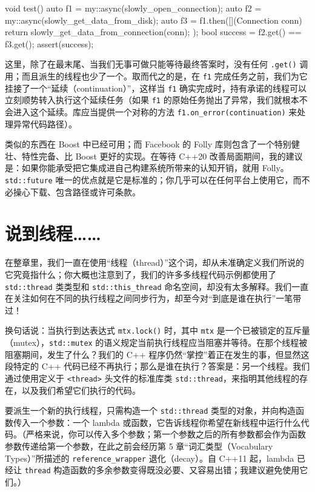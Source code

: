 \begin{codebox}[cpp]
    void test() {
      auto f1 = my::async(slowly_open_connection);
      auto f2 = my::async(slowly_get_data_from_disk);
      auto f3 = f1.then([](Connection conn) {
        return slowly_get_data_from_connection(conn);
      });
      bool success = f2.get() == f3.get();
      assert(success);
    }
\end{codebox}

这里，除了在最末尾、当我们无事可做只能等待最终答案时，没有任何 \texttt{.get(\allowbreak{})\allowbreak{}} 调用；而且派生的线程也少了一个。取而代之的是，在 \texttt{f1} 完成任务之前，我们为它挂接了一个“延续（continuation）”，这样当 \texttt{f1} 确实完成时，持有承诺的线程可以立刻顺势转入执行这个延续任务（如果 \texttt{f1} 的原始任务抛出了异常，我们就根本不会进入这个延续。库应当提供一个对称的方法 \texttt{f1.on\_\allowbreak{}error(\allowbreak{}continuation)\allowbreak{}} 来处理异常代码路径）。

类似的东西在 Boost 中已经可用；而 Facebook 的 Folly 库则包含了一个特别健壮、特性完备、比 Boost 更好的实现。在等待 C++20 改善局面期间，我的建议是：如果你能承受把它集成进自己构建系统所带来的认知开销，就用 Folly。\texttt{std::\allowbreak{}future} 唯一的优点就是它是标准的；你几乎可以在任何平台上使用它，而不必操心下载、包含路径或许可条款。

\section{说到线程……}

在整章里，我们一直在使用“线程（thread）”这个词，却从未准确定义我们所说的它究竟指什么；你大概也注意到了，我们的许多多线程代码示例都使用了 \texttt{std::\allowbreak{}thread} 类类型和 \texttt{std::\allowbreak{}this\_\allowbreak{}thread} 命名空间，却没有太多解释。我们一直在关注如何在不同的执行线程之间同步行为，却至今对“到底是谁在执行”一笔带过！

换句话说：当执行到达表达式 \texttt{mtx.\allowbreak{}lock(\allowbreak{})\allowbreak{}} 时，其中 \texttt{mtx} 是一个已被锁定的互斥量（mutex），\texttt{std::\allowbreak{}mutex} 的语义规定当前执行线程应当阻塞并等待。在那个线程被阻塞期间，发生了什么？我们的 C++ 程序仍然“掌控”着正在发生的事，但显然这段特定的 C++ 代码已经不再执行；那么是谁在执行？答案是：另一个线程。我们通过使用定义于 \texttt{<thread>\allowbreak{}} 头文件的标准库类 \texttt{std::\allowbreak{}thread}，来指明其他线程的存在，以及我们希望它们执行的代码。

要派生一个新的执行线程，只需构造一个 \texttt{std::\allowbreak{}thread} 类型的对象，并向构造函数传入一个参数：一个 lambda 或函数，它告诉线程你希望在新线程中运行什么代码。（严格来说，你可以传入多个参数；第一个参数之后的所有参数都会作为函数参数传递给第一个参数，在此之前会经历第 5 章“词汇类型（Vocabulary Types）”所描述的 \texttt{reference\_\allowbreak{}wrapper} 退化（decay）。自 C++11 起，lambda 已经让 \texttt{thread} 构造函数的多余参数变得既没必要、又容易出错；我建议避免使用它们。）

